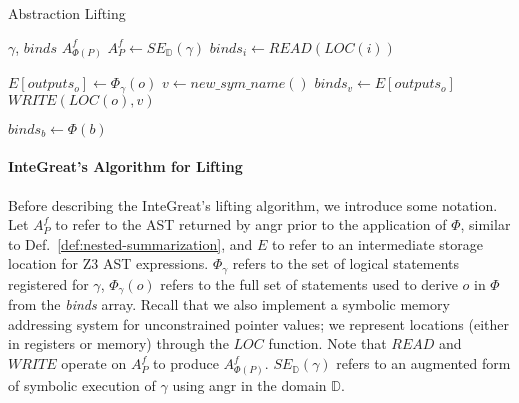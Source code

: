
\renewcommand{\algorithmicrequire}{\textbf{Input:}}
\renewcommand{\algorithmicensure}{\textbf{Output:}}

\begin{algorithm}
    \caption{Abstraction Lifting}
    \begin{algorithmic}[1]
        \Require $\gamma$, $binds$
        \Ensure $A_{\Phi(P)}^{f}$
	    \State $A_{P}^{f} \leftarrow SE_{\mathbb{D}}(\gamma)$
 	     
	    \State $binds_{i} \leftarrow READ(LOC(i))$
        \EndFor
         
	
	    \State $E[outputs_{o}] \leftarrow \Phi_{\gamma}(o)$ 
	    \State $v \leftarrow new\_sym\_name()$
	    \State $binds_{v} \leftarrow E[outputs_{o}]$ 
	    \State $WRITE(LOC(o), v)$ 
        \EndFor

	    \State $binds_{b} \leftarrow \Phi(b)$
        \EndFor
    \end{algorithmic}
    \label{alg:abst-binding}
\end{algorithm}

\paragraph{InteGreat's Algorithm for Lifting}
\label{sec:integreat-alg}
Before describing the InteGreat's lifting algorithm, we introduce some notation.
Let $A_{P}^{f}$ to refer to the AST returned by angr prior to the application of $\Phi$, similar to Def.~\ref{def:nested-summarization}, and $E$ to refer to an intermediate storage location for Z3 AST expressions.
$\Phi_{\gamma}$ refers to the set of logical statements registered for $\gamma$, $\Phi_{\gamma}(o)$ refers to the full set of statements used to derive $o$ in $\Phi$ from the \emph{binds} array.
Recall that we also implement a symbolic memory addressing system for unconstrained pointer values; we represent locations (either in registers or memory) through the $LOC$ function.
Note that $READ$ and $WRITE$ operate on $A_{P}^{f}$ to produce $A_{\Phi(P)}^{f}$.
$SE_{\mathbb{D}}(\gamma)$ refers to an augmented form of symbolic execution of $\gamma$ using angr in the domain $\mathbb{D}$.

